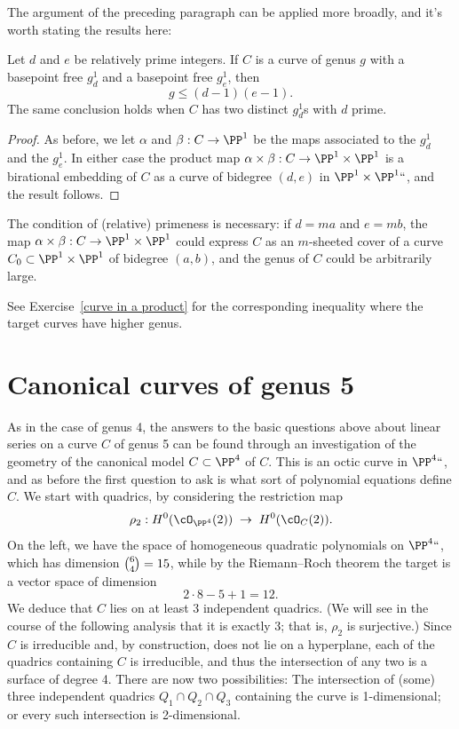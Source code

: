 The argument of the preceding paragraph can be applied more broadly,
and it's worth stating the results here:

\begin{proposition}\label{general gonality exclusion}
Let $d$ and $e$ be relatively prime integers. If $C$ is a curve of genus $g$ with a basepoint free $g^1_d$ and a basepoint free $g^1_e$, then
$$
g \leq (d-1)(e-1).
$$
The same conclusion holds when $C$ has two distinct
$g^1_d$s with $d$ prime.
%
\end{proposition}

\begin{proof}
As before, we let $\alpha$ and $\beta : C \to \PP^1$ be the maps
associated to the $g^1_d$ and the $g^1_e$. In either case
the
product map $\alpha \times \beta : C \to \PP^1 \times \PP^1$ is a
birational embedding of $C$ as a curve of bidegree $(d,e)$ in $\PP^1
\times \PP^1` `$, and the result follows.
\end{proof}


The condition of (relative) primeness is necessary: if $d=ma$ and
$e=mb$, the map $\alpha \times \beta : C \to \PP^1 \times \PP^1$ could
express $C$ as an $m$-sheeted cover of a curve $C_0 \subset \PP^1
\times \PP^1$ of bidegree $(a,b)$, and the genus of $C$ could be
arbitrarily large.

See Exercise~\ref{curve in a product} for the corresponding inequality
where the target curves have higher genus.

%

\section{Canonical curves of genus 5}

As in the  case of genus 4, the answers to the basic questions above
about linear series on a curve $C$ of genus 5 can be found through an
investigation of the geometry of the canonical model $C \subset \PP^4$
of $C$. This is an
octic curve
%
in $\PP^4` `$, and as before the first
question to ask is what sort of polynomial equations define $C$. We
start with quadrics, by considering the restriction map
%
$$
\rho_2 : H^0(\cO_{\PP^4}(2)) \; \to \; H^0(\cO_{C}(2)).
$$
On the left, we have the space of homogeneous quadratic polynomials on
$\PP^4` `$, which has dimension $\tbinom{6}{4} = 15$, while by the
Riemann--Roch theorem
%
the target is a vector space of dimension
$$
2\cdot8 - 5 + 1 = 12.
$$
We deduce that $C$ lies on at least 3 independent quadrics. (We will
see in the course of the following analysis that it is exactly 3; that
is, $\rho_2$ is surjective.) Since $C$ is irreducible and, by
construction, does not lie on a hyperplane, each of the quadrics
containing $C$ is irreducible, and thus the intersection of any two is
a surface of degree 4. There are now two possibilities:  The
intersection of (some) three independent  quadrics $Q_1 \cap Q_2 \cap
Q_3$ containing the curve is 1-dimensional; or every such intersection
is 2-dimensional.

